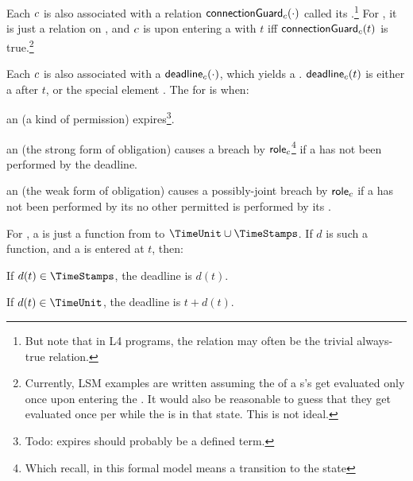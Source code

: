\documentclass[12pt]{article}
\begin{document}



\medskip

Each \actionrule $c$ is also associated with a relation $\textsf{connectionGuard}_{c}(\cdot)$ called its .\footnote{But note that in L4 programs, the relation may often be the trivial always-true relation.} For \FSContracts, it is just a relation on \TimeStamps,
and \nameforaedge\xspace $c$ is  upon entering a \GlobalState with \TimeStamp $t$ iff $\textsf{connectionGuard}_{c}(t)$ is true.\footnote{Currently, LSM examples are written assuming the \TGuards of a \State s's \actionrules get evaluated only once upon entering the \State. It would also be reasonable to guess that they get evaluated once per \TimeUnit while the \Contract is in that state. This is not ideal.}

\medskip

Each \actionrule $c$ is also associated with a  $\textsf{deadline}_{c}(\cdot)$, which yields a . $\textsf{deadline}_{c}(t)$ is either a \TimeStamp after $t$, or the special element . The \Deadline for \nameforaedge is when:

\begin{LPPI}
	\item an \enabled \maynarule (a kind of permission) expires\footnote{Todo: expires should probably be a defined term.}.
	\item an \enabled \mustnarule (the strong form of obligation) causes a breach by $\textsf{role}_{c}$\footnote{Which recall, in this formal model means a transition to the state \breached{\{\role{\evar}\}}} if a \compatible \Event has not been performed by the deadline.
	\item an \enabled \rmustnarule (the weak form of obligation) causes a possibly-joint breach by $\textsf{role}_{c}$ if a \compatible \Event has not been performed by its \Deadline\xspace {\bf and} no other permitted \Event is performed by its \Deadline.
	\end{LPPI}
For \FSContracts, a \DeadlineFn is just a function from \TimeStamps to $\TimeUnit \cup \TimeStamps$. If $d$ is such a function, and a \State is entered at \TimeStamp $t$, then:
\begin{LPPI}
\item If $d(t) \in \TimeStamps$, the deadline is $d(t)$.
	\item If $d(t) \in \TimeUnit$, the deadline is $t + d(t)$.
\end{LPPI}
\end{document}
